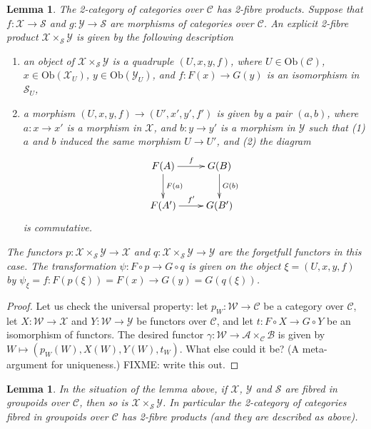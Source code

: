 \documentclass{amsart}
\newtheorem{lemma}[theorem]{Lemma}
\theoremstyle{definition}
\theoremstyle{remark}
\numberwithin{equation}{subsection}
\begin{document}
\begin{lemma}
\label{lemma-2-product-categories-over-C} The 2-category of categories
over $\mathcal{C}$ has 2-fibre products. Suppose that
$f : \mathcal{X} \to \mathcal{S}$ and
$g : \mathcal{Y} \to \mathcal{S}$ are morphisms of categories over
$\mathcal{C}$. An explicit 2-fibre product
$\mathcal{X} \times_\mathcal{S}\mathcal{Y}$ is given by the following
description
\begin{enumerate}
\item an object of $\mathcal{X}\times_\mathcal{S} \mathcal{Y}$ is a quadruple
$(U,x,y,f)$, where $U \in \text{Ob}(\mathcal{C})$,
$x\in \text{Ob}(\mathcal{X}_U)$, $y\in \text{Ob}(\mathcal{Y}_U)$,
and $f : F(x) \to G(y)$ is an isomorphism in $\mathcal{S}_U$,
\item a morphism $(U,x,y,f) \to (U',x',y', f')$ is given by a pair $(a,b)$,
where $a : x \to x'$ is a morphism in $\mathcal{X}$, and $b : y \to y'$ is a
morphism in $\mathcal{Y}$ such that (1) $a$ and $b$ induced the same
morphism $U \to U'$, and (2) the diagram 
$$
\xymatrix{
F(A) \ar[r]^f \ar[d]^{F(a)} & G(B) \ar[d]^{G(b)} \\
F(A') \ar[r]^{f'} & G(B')
}
$$
is commutative.
\end{enumerate}
The functors $p : \mathcal{X}\times_\mathcal{S}\mathcal{Y} \to \mathcal{X}$
and $q : \mathcal{X}\times_\mathcal{S}\mathcal{Y} \to \mathcal{Y}$ are the
forgetfull functors in this case. The transformation $\psi : F \circ p \to
G \circ q$ is given on the object $\xi = (U,x,y,f)$ by
$\psi_\xi = f : F(p(\xi)) = F(x) \to G(y) = G(q(\xi))$.
\end{lemma}

\begin{proof}
Let us check the universal property: let $p_W : \mathcal{W}\to \mathcal{C}$
be a category over $\mathcal{C}$, let $X : \mathcal{W} \to \mathcal{X}$ and
$Y : \mathcal{W} \to \mathcal{Y}$ be functors over $\mathcal{C}$, and let
$t : F \circ X \to G \circ Y$ be an isomorphism of functors.
The desired functor
$\gamma : \mathcal{W} \to \mathcal{A}\times_\mathcal{C}\mathcal{B}$
is given by $W \mapsto (p_W(W), X(W), Y(W), t_W)$. What else could it be? 
(A meta-argument for uniqueness.) FIXME: write this out.
\end{proof}

\begin{lemma}
\label{lemma-2-product-fibred-categories}
In the situation of the lemma above, if $\mathcal{X}$, $\mathcal{Y}$ and 
$\mathcal{S}$ are fibred in groupoids over $\mathcal{C}$, then so is
$\mathcal{X}\times_\mathcal{S}\mathcal{Y}$. In particular the 2-category
of categories fibred in groupoids over $\mathcal{C}$ has 2-fibre products
(and they are described as above).
\end{lemma}
\end{document}
